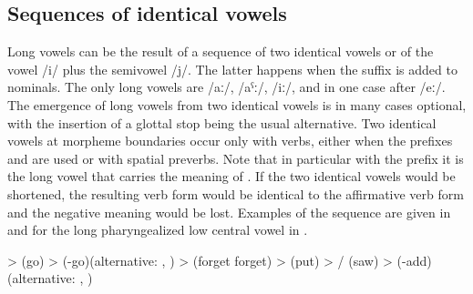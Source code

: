 
\subsection{Sequences of identical vowels}
\label{ssec:Sequences of identical vowels}

Long vowels can be the result of a sequence of two identical vowels or of the vowel /i/ plus the semivowel /j/. The latter happens when the  suffix is added to nominals. The only long vowels are /aː/, /aˁː/, /iː/, and in one case after  /eː/. The emergence of long vowels from two identical vowels is in many cases optional, with the insertion of a glottal stop being the usual alternative. Two identical vowels at morpheme boundaries occur only with verbs, either when the  prefixes  and  are used or with spatial preverbs. Note that in particular with the  prefix it is the long vowel that carries the meaning of . If the two identical vowels would be shortened, the resulting verb form would be identical to the affirmative verb form and the negative meaning would be lost. Examples of the sequence are given in  and for the long pharyngealized low central vowel in .
%
\begin{exe}
	\ex	\label{ex:identical vowels A phon}
	\begin{xlist}
		\ex	{} >   (go)
		\ex	{} >   (-go)\newline\hspace*{1em}(alternative: , )
		\ex	{} >  \newline\hspace*{1em}(forget forget) 
		\ex	{} >  \newline\hspace*{1em}(put)
		\ex	{} > \slash{}  (saw)
		\ex	{} >   (-add)\newline\hspace*{1em}(alternative: , )
	\end{xlist}
\end{exe}


